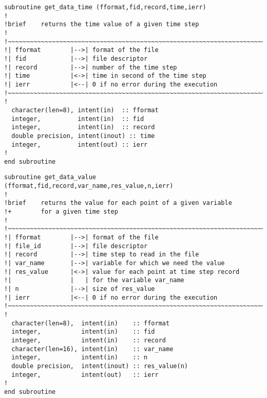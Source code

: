 %
\begin{lstlisting}
subroutine get_data_time (fformat,fid,record,time,ierr)
!
!brief    returns the time value of a given time step
!
!~~~~~~~~~~~~~~~~~~~~~~~~~~~~~~~~~~~~~~~~~~~~~~~~~~~~~~~~~~~~~~~~~~~~~~~
!| fformat        |-->| format of the file
!| fid            |-->| file descriptor
!| record         |-->| number of the time step
!| time           |<->| time in second of the time step
!| ierr           |<--| 0 if no error during the execution
!~~~~~~~~~~~~~~~~~~~~~~~~~~~~~~~~~~~~~~~~~~~~~~~~~~~~~~~~~~~~~~~~~~~~~~~
!
  character(len=8), intent(in)  :: fformat
  integer,          intent(in)  :: fid
  integer,          intent(in)  :: record
  double precision, intent(inout) :: time
  integer,          intent(out) :: ierr
!
end subroutine
\end{lstlisting}
%
\begin{lstlisting}
subroutine get_data_value (fformat,fid,record,var_name,res_value,n,ierr)
!
!brief    returns the value for each point of a given variable
!+        for a given time step
!
!~~~~~~~~~~~~~~~~~~~~~~~~~~~~~~~~~~~~~~~~~~~~~~~~~~~~~~~~~~~~~~~~~~~~~~~
!| fformat        |-->| format of the file
!| file_id        |-->| file descriptor
!| record         |-->| time step to read in the file
!| var_name       |-->| variable for which we need the value
!| res_value      |<->| value for each point at time step record
!|                |   | for the variable var_name
!| n              |-->| size of res_value
!| ierr           |<--| 0 if no error during the execution
!~~~~~~~~~~~~~~~~~~~~~~~~~~~~~~~~~~~~~~~~~~~~~~~~~~~~~~~~~~~~~~~~~~~~~~~
!
  character(len=8),  intent(in)    :: fformat
  integer,           intent(in)    :: fid
  integer,           intent(in)    :: record
  character(len=16), intent(in)    :: var_name
  integer,           intent(in)    :: n
  double precision,  intent(inout) :: res_value(n)
  integer,           intent(out)   :: ierr
!
end subroutine
\end{lstlisting}
%
